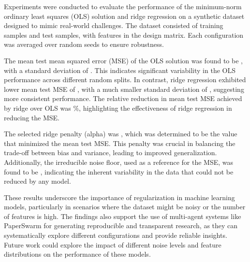 Experiments were conducted to evaluate the performance of the minimum-norm ordinary least squares (OLS) solution and ridge regression on a synthetic dataset designed to mimic real-world challenges. The dataset consisted of  training samples and  test samples, with  features in the design matrix. Each configuration was averaged over  random seeds to ensure robustness. 

The mean test mean squared error (MSE) of the OLS solution was found to be , with a standard deviation of . This indicates significant variability in the OLS performance across different random splits. In contrast, ridge regression exhibited lower mean test MSE of , with a much smaller standard deviation of , suggesting more consistent performance. The relative reduction in mean test MSE achieved by ridge over OLS was \%, highlighting the effectiveness of ridge regression in reducing the MSE.

The selected ridge penalty (alpha) was , which was determined to be the value that minimized the mean test MSE. This penalty was crucial in balancing the trade-off between bias and variance, leading to improved generalization. Additionally, the irreducible noise floor, used as a reference for the MSE, was found to be , indicating the inherent variability in the data that could not be reduced by any model.

These results underscore the importance of regularization in machine learning models, particularly in scenarios where the dataset might be noisy or the number of features is high. The findings also support the use of multi-agent systems like PaperSwarm for generating reproducible and transparent research, as they can systematically explore different configurations and provide reliable insights. Future work could explore the impact of different noise levels and feature distributions on the performance of these models.
